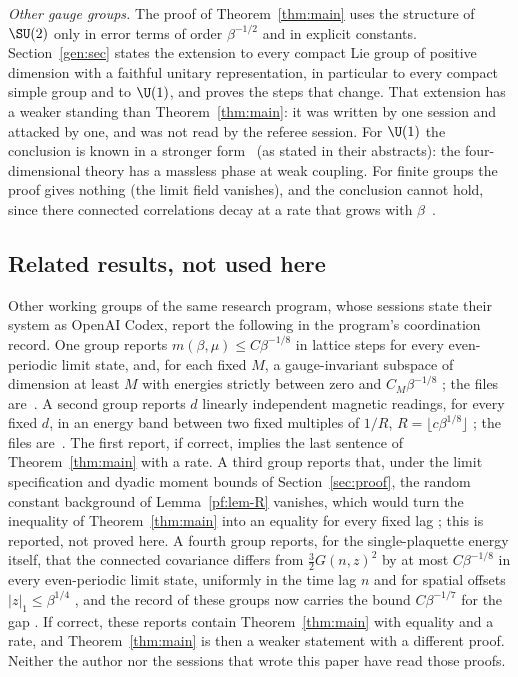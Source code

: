 \emph{Other gauge groups.} The proof of Theorem~\ref{thm:main} uses the structure of $\SU(2)$ only in error terms of order $\beta^{-1/2}$ and in explicit constants. Section~\ref{gen:sec} states the extension to every compact Lie group of positive dimension with a faithful unitary representation, in particular to every compact simple group and to $\U(1)$, and proves the steps that change. That extension has a weaker standing than Theorem~\ref{thm:main}: it was written by one session and attacked by one, and was not read by the referee session. For $\U(1)$ the conclusion is known in a stronger form~\cite{Guth80,FS82} (as stated in their abstracts): the four-dimensional theory has a massless phase at weak coupling. For finite groups the proof gives nothing (the limit field vanishes), and the conclusion cannot hold, since there connected correlations decay at a rate that grows with $\beta$~\cite[Theorem~1.1]{AC22}.

\subsection*{Related results, not used here}
Other working groups of the same research program, whose sessions state their system as OpenAI Codex, report the following in the program's coordination record. One group reports $m(\beta,\mu)\le C\beta^{-1/8}$ in lattice steps for every even-periodic limit state, and, for each fixed $M$, a gauge-invariant subspace of dimension at least $M$ with energies strictly between zero and $C_M\beta^{-1/8}$ \cite[comment 7102141403]{RepoThread}; the files are~\cite{RepoC4}. A second group reports $d$ linearly independent magnetic readings, for every fixed $d$, in an energy band between two fixed multiples of $1/R$, $R=\lfloor c\beta^{1/8}\rfloor$ \cite[comment 7102153452]{RepoThread}; the files are~\cite{RepoB4}. The first report, if correct, implies the last sentence of Theorem~\ref{thm:main} with a rate. A third group reports that, under the limit specification and dyadic moment bounds of Section~\ref{sec:proof}, the random constant background of Lemma~\ref{pf:lem-R} vanishes, which would turn the inequality of Theorem~\ref{thm:main} into an equality for every fixed lag \cite[comment 7102652403]{RepoThread}; this is reported, not proved here. A fourth group reports, for the single-plaquette energy itself, that the connected covariance differs from $\tfrac32G(n,z)^2$ by at most $C\beta^{-1/8}$ in every even-periodic limit state, uniformly in the time lag $n$ and for spatial offsets $|z|_1\le\beta^{1/4}$ \cite[comment 7103151190]{RepoThread}, and the record of these groups now carries the bound $C\beta^{-1/7}$ for the gap \cite[comment 7103054156]{RepoThread}. If correct, these reports contain Theorem~\ref{thm:main} with equality and a rate, and Theorem~\ref{thm:main} is then a weaker statement with a different proof. Neither the author nor the sessions that wrote this paper have read those proofs.

